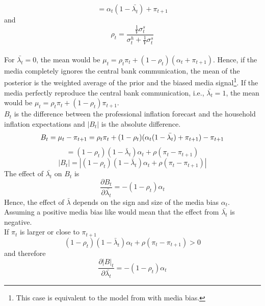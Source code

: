 \documentclass[review]{elsarticle}
\begin{document}
\begin{equation}
=\alpha_t(1- \bar{\lambda_t}) + \pi_{t+1}
\end{equation}
and
\begin{equation}
\rho_t = \frac{\frac{1}{V}\sigma^s_t}{{\sigma^h_t + \frac{1}{V}}\sigma^s_t}
\end{equation}
\\
For $\bar{\lambda_t} = 0$, the mean would be $\mu_t = \rho_t \pi_t + (1- \rho_t) (\alpha_t + \pi_{t+1})$. Hence, if the media completely ignores the central bank communication, the mean of the posterior is the weighted average of the prior and the biased media signal\footnote{This case is equivalent to the model from \cite{LamlaLein2014} with media bias.}. If the media perfectly reproduce the central bank communication, i.e., $\bar{\lambda_t} = 1$, the mean would be $\mu_t = \rho_t \pi_t + (1-\rho_t) \pi_{t+1}$. 
\\
$B_t$ is the difference between the professional inflation forecast and the household inflation expectations and $|B_t|$ is the absolute difference. %
\begin{equation}
B_t = \mu_t - \pi_{t+1} = \rho_t \pi_t + (1-\rho_t)(\alpha_t(1- \bar{\lambda_t}) + \pi_{t+1}) - \pi_{t+1} \\
\end{equation} 
\begin{equation}
= (1-\rho_t)(1-\bar{\lambda}_t)\alpha_t + \rho(\pi_t - \pi_{t+1})
\end{equation}
\begin{equation}
|B_t| = |(1-\rho_t)(1-\bar{\lambda}_t)\alpha_t + \rho(\pi_t - \pi_{t+1})|
\end{equation} 
The effect of $\bar{\lambda_t}$ on $B_t$ is
\begin{equation}
\frac{\partial B_t}{\partial \bar{\lambda_t}} = -(1-\rho_t)\alpha_t
\end{equation}
Hence, the effect of $\bar{\lambda}$ depends on the sign and size of the media bias $\alpha_t$. Assuming a positive media bias like \cite{LamlaLein2014} would mean that the effect from $\bar{\lambda_t}$ is negative.  
\\
If $\pi_t$ is larger or close to $\pi_{t+1}$ 
\begin{equation}
(1-\rho_t)(1-\bar{\lambda}_t)\alpha_t + \rho(\pi_t - \pi_{t+1}) > 0
\end{equation} 
and therefore
\begin{equation}
\frac{\partial |B|_t}{\partial \bar{\lambda_t}} = -(1-\rho_t)\alpha_t
\end{equation}
\end{document}
